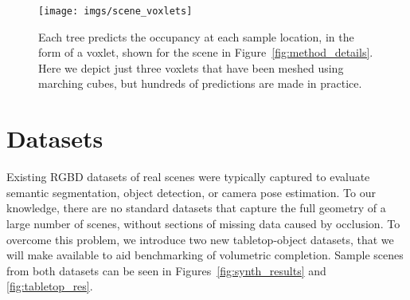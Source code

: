 \documentclass[10pt,twocolumn,letterpaper]{article}
\begin{document}
\begin{figure}[t]
     \texttt{[image: imgs/scene\_voxlets]}
         \caption{Each tree predicts the occupancy at each sample location, in the form of a voxlet, shown for the scene in Figure~\ref{fig:method_details}. Here we depict just three voxlets that have been meshed using marching cubes, but hundreds of predictions are made in practice.}
    \label{fig:voxlets}
    \vspace{-6pt}
\end{figure}




\section{Datasets}
\label{sec:datasets}
Existing RGBD datasets of real scenes were typically captured to evaluate semantic segmentation, object detection, or camera pose estimation.
To our knowledge, there are no standard datasets that capture the full geometry of a large number of scenes, without sections of missing data caused by occlusion.
To overcome this problem, we introduce two new tabletop-object datasets, that we will make available to aid benchmarking of volumetric completion.
Sample scenes from both datasets can be seen in Figures~\ref{fig:synth_results} and \ref{fig:tabletop_res}.
\end{document}
